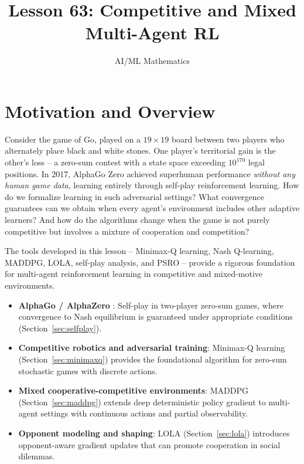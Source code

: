 \documentclass[11pt,a4paper]{article}
\title{Lesson 63: Competitive and Mixed Multi-Agent RL}
\author{AI/ML Mathematics}
\date{}
\begin{document}
\maketitle
\tableofcontents
\newpage

\section{Motivation and Overview}

Consider the game of Go, played on a $19 \times 19$ board between two
players who alternately place black and white stones.  One player's
territorial gain is the other's loss -- a zero-sum contest with a state
space exceeding $10^{170}$ legal positions.  In 2017, AlphaGo Zero
\citep{silver2017} achieved superhuman performance \emph{without any
human game data}, learning entirely through self-play reinforcement
learning.  How do we formalize learning in such adversarial settings?
What convergence guarantees can we obtain when every agent's environment
includes other adaptive learners?  And how do the algorithms change when
the game is not purely competitive but involves a mixture of cooperation
and competition?

The tools developed in this lesson -- Minimax-Q learning, Nash
Q-learning, MADDPG, LOLA, self-play analysis, and PSRO -- provide a
rigorous foundation for multi-agent reinforcement learning in competitive
and mixed-motive environments.

\begin{rlconnection}
\begin{itemize}
  \item \textbf{AlphaGo / AlphaZero} \citep{silver2016,silver2017}:
    Self-play in two-player zero-sum games, where convergence to Nash
    equilibrium is guaranteed under appropriate conditions (Section~\ref{sec:selfplay}).
  \item \textbf{Competitive robotics and adversarial training}: Minimax-Q
    learning (Section~\ref{sec:minimaxq}) provides the foundational
    algorithm for zero-sum stochastic games with discrete actions.
  \item \textbf{Mixed cooperative-competitive environments}: MADDPG
    (Section~\ref{sec:maddpg}) extends deep deterministic policy gradient
    to multi-agent settings with continuous actions and partial
    observability.
  \item \textbf{Opponent modeling and shaping}: LOLA
    (Section~\ref{sec:lola}) introduces opponent-aware gradient updates
    that can promote cooperation in social dilemmas.
\end{itemize}
\end{rlconnection}
\end{document}
